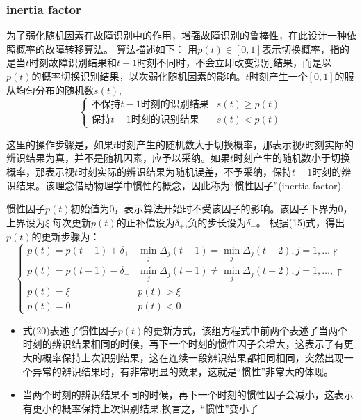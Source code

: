 \documentclass[lang=cn,11pt,a4paper]{elegantpaper}
\begin{document}
\subsubsection{
	inertia factor}
为了弱化随机因素在故障识别中的作用，增强故障识别的鲁棒性，在此设计一种依照概率的故障转移算法。
算法描述如下：
用$p(t)\in\left[ 0,1\right] $表示切换概率，指的是当$t$时刻故障识别结果和$t-1$时刻不同时，不会立即改变识别结果，而是以$p(t)$的概率切换识别结果，以次弱化随机因素的影响。$t$时刻产生一个$\left[ 0,1\right] $的服从均匀分布的随机数$s(t)$,
\begin{equation}
	\begin{cases}
		\text{不保持}t-1\text{时刻的识别结果} &s(t)\geq p(t)\\
		\text{保持$t-1$时刻的识别结果} &s(t)< p(t)
	\end{cases}
\end{equation}
\begin{shaded}
	{这里的操作步骤是，如果$t$时刻产生的随机数大于切换概率，那表示视$t$时刻实际的辨识结果为真，并不是随机因素，应予以采纳。如果$t$时刻产生的随机数小于切换概率，那表示视$t$时刻实际的辨识结果为随机误差，不予采纳，保持$t-1$时刻的辨识结果}。该理念借助物理学中惯性的概念，因此称为“惯性因子”(inertia factor).
\end{shaded}
惯性因子$p(t)$初始值为0，表示算法开始时不受该因子的影响。该因子下界为0，上界设为$\xi$,每次更新$p(t)$的正补偿设为$\delta_+$,负的步长设为$\delta_-$。
根据(15)式，得出$p(t)$的更新步骤为：
\begin{equation}
	\begin{cases}
		p(t)  = p(t-1)+\delta_+ &\min \limits_{j}\Delta_j(t-1) = \min \limits_{j}\Delta_j(t-2),j = 1,\ldots \digamma\\
		p(t)  = p(t-1)-\delta_- &\min \limits_{j}\Delta_j(t-1)\neq \min \limits_{j}\Delta_j(t-2), j= 1,\ldots,\digamma\\
		p(t) = \xi &p(t)>\xi\\
		p(t) = 0 &p(t)<0
	\end{cases}
\end{equation}
\begin{shaded}
	\begin{itemize}
		\item 式(20)表述了惯性因子$p(t)$的更新方式，该组方程式中前两个表述了当两个时刻的辨识结果相同的时候，再下一个时刻的惯性因子会增大，这表示了有更大的概率保持上次识别结果，这在连续一段辨识结果都相同相同，突然出现一个异常的辨识结果时，有非常明显的效果，这就是“惯性”非常大的体现。
		\item 
		当两个时刻的辨识结果不同的时候，再下一个时刻的惯性因子会减小，这表示有更小的概率保持上次识别结果,换言之，“惯性”变小了
	\end{itemize}
\end{shaded}
\end{document}
